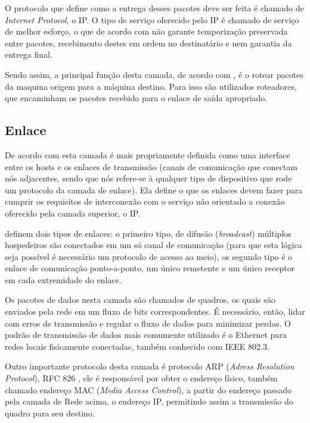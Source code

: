 O protocolo que define como a entrega desses pacotes deve ser feita é chamado de \textit{Internet Protocol}, o IP. O tipo de serviço oferecido pelo IP é chamado de serviço de melhor esforço, o que de acordo com  não garante temporização preservada entre pacotes, recebimento destes em ordem no destinatário e nem garantia da entrega final. 

Sendo assim, a principal função desta camada, de acordo com , é o rotear pacotes da maquina origem para a máquina destino. Para isso são utilizados roteadores, que encaminham os pacotes recebido para o enlace de saída apropriado.


\subsection{Enlace}

De acordo com  esta camada é mais propriamente definida como uma interface entre os hosts e os enlaces de transmissão (canais de comunicação que conectam nós adjacentes, sendo que nós refere-se à qualquer tipo de dispositivo que rode um protocolo da camada de enlace). Ela define o que os enlaces devem fazer para cumprir os requisitos de interconexão com o serviço não orientado a conexão oferecido pela camada superior, o IP.

 definem dois tipos de enlaces: o primeiro tipo, de difusão (\textit{broadcast}) múltiplos hospedeiros são conectados em um só canal de comunicação (para que esta lógica seja possível é necessário um protocolo de acesso ao meio), os segundo tipo é o enlace de comunicação ponto-a-ponto, um único remetente e um único receptor em cad\texttt{\texttt{}}a extremidade do enlace.

Os pacotes de dados nesta camada são chamados de quadros, os quais são enviados pela rede em um fluxo de bits correspondentes. É necessário, então, lidar com erros de transmissão e regular o fluxo de dados para minimizar perdas. O padrão de transmissão de dados mais comumente utilizado é o Ethernet para redes locais fisicamente conectadas, também conhecido com IEEE 802.3.

Outro importante protocolo desta camada é protocolo ARP (\textit{Adress Resolution Protocol}), RFC 826 \cite{RFC826}, ele é responsável por obter o endereço físico, tamb\'em chamado endereço MAC (\textit{Media Access Control}), a partir do endereço passado pela camada de Rede acima, o endereço IP, permitindo assim a transmiss\~ao do quadro para seu destino.

